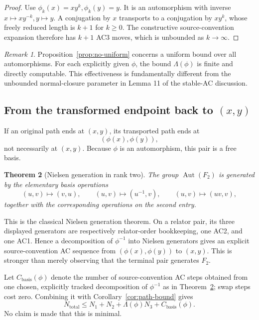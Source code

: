 \documentclass[11pt]{article}
\newtheorem{theorem}{Theorem}[section]
\theoremstyle{definition}
\theoremstyle{remark}
\newtheorem{remark}[theorem]{Remark}
\newcommand{\F}{F_2}
\newcommand{\Aut}{\operatorname{Aut}}
\begin{document}
\begin{proof}
Use \(\phi_k(x)=xy^k,\phi_k(y)=y\).  It is an automorphism with inverse
\(x\mapsto xy^{-k},y\mapsto y\).  A conjugation by \(x\) transports to a
conjugation by \(xy^k\), whose freely reduced length is \(k+1\) for
\(k\ge0\).  The constructive source-convention expansion therefore has
\(k+1\) AC3 moves, which is unbounded as \(k\to\infty\).
\end{proof}

\begin{remark}
Proposition~\ref{prop:no-uniform} concerns a uniform bound over all
automorphisms.  For each explicitly given \(\phi\), the bound
\(\Lambda(\phi)\) is finite and directly computable.  This effectiveness is
fundamentally different from the unbounded normal-closure parameter in
Lemma 11 of the stable-AC discussion.
\end{remark}

\subsection{From the transformed endpoint back to \((x,y)\)}

If an original path ends at \((x,y)\), its transported path ends at
\[
  (\phi(x),\phi(y)),
\]
not necessarily at \((x,y)\).  Because \(\phi\) is an automorphism, this pair
is a free basis.

\begin{theorem}[Nielsen generation in rank two]
\label{thm:nielsen-generation}
The group \(\Aut(\F)\) is generated by the elementary basis operations
\[
(u,v)\mapsto(v,u),\qquad
(u,v)\mapsto(u^{-1},v),\qquad
(u,v)\mapsto(uv,v),
\]
together with the corresponding operations on the second entry.
\end{theorem}

This is the classical Nielsen generation theorem.  On a relator pair, its
three displayed generators are respectively relator-order bookkeeping,
one AC2, and one AC1.  Hence a decomposition of \(\phi^{-1}\) into Nielsen
generators gives an explicit source-convention AC sequence from
\((\phi(x),\phi(y))\) to \((x,y)\).  This is stronger than merely observing
that the terminal pair generates \(\F\).

Let \(C_{\mathrm{basis}}(\phi)\) denote the number of source-convention AC
steps obtained from one chosen, explicitly tracked decomposition of
\(\phi^{-1}\) as in Theorem~\ref{thm:nielsen-generation}; swap steps cost
zero.  Combining it with
Corollary~\ref{cor:path-bound} gives
\[
  N_{\mathrm{total}}
  \le
  N_1+N_2+\Lambda(\phi)N_3+C_{\mathrm{basis}}(\phi).
\]
No claim is made that this is minimal.
\end{document}
